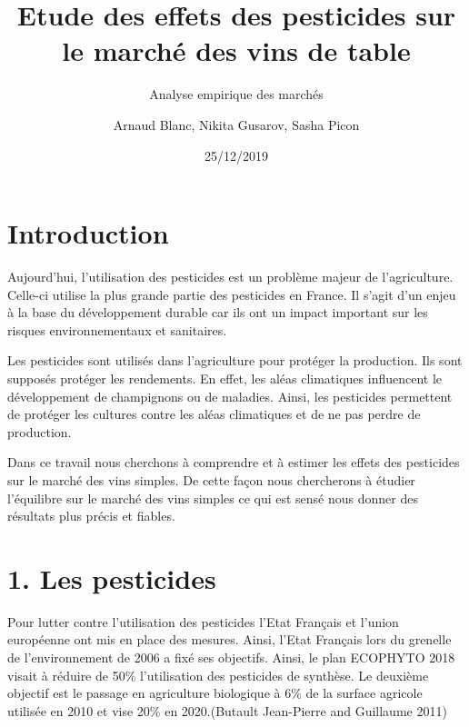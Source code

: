 \documentclass[11pt,]{article}
\title{Etude des effets des pesticides sur le marché des vins de table}
\subtitle{Analyse empirique des marchés}
\author{Arnaud Blanc, Nikita Gusarov, Sasha Picon}
\date{25/12/2019}
\begin{document}
\maketitle


\hypersetup{linkcolor = black}

\tableofcontents





\newpage

\hypersetup{linkcolor = blue}

\hypertarget{introduction}{%
\section{Introduction}\label{introduction}}

Aujourd'hui, l'utilisation des pesticides est un problème majeur de
l'agriculture. Celle-ci utilise la plus grande partie des pesticides en
France. Il s'agit d'un enjeu à la base du développement durable car ils
ont un impact important sur les risques environnementaux et sanitaires.

Les pesticides sont utilisés dans l'agriculture pour protéger la
production. Ils sont supposés protéger les rendements. En effet, les
aléas climatiques influencent le développement de champignons ou de
maladies. Ainsi, les pesticides permettent de protéger les cultures
contre les aléas climatiques et de ne pas perdre de production.

Dans ce travail nous cherchons à comprendre et à estimer les effets des
pesticides sur le marché des vins simples. De cette façon nous
chercherons à étudier l'équilibre sur le marché des vins simples ce qui
est sensé nous donner des résultats plus précis et fiables.

\hypertarget{les-pesticides}{%
\section{1. Les pesticides}\label{les-pesticides}}

Pour lutter contre l'utilisation des pesticides l'Etat Français et
l'union européenne ont mis en place des mesures. Ainsi, l'Etat Français
lors du grenelle de l'environnement de 2006 a fixé ses objectifs. Ainsi,
le plan ECOPHYTO 2018 visait à réduire de 50\% l'utilisation des
pesticides de synthèse. Le deuxième objectif est le passage en
agriculture biologique à 6\% de la surface agricole utilisée en 2010 et
vise 20\% en 2020.(Butault Jean-Pierre and Guillaume 2011)
\end{document}
